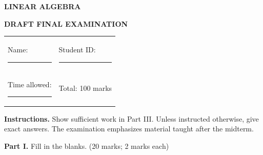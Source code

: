 \documentclass[11pt,a4paper]{article}
\newcommand{\parttitle}[2]{%
  \vspace{1mm}
  {\color{examblue}\Large\bfseries #1}\quad
  {\color{examblue}\large #2}\par\vspace{3mm}
}
\begin{document}
\begin{center}
  {\color{examblue}\LARGE\bfseries LINEAR ALGEBRA}\par
  \vspace{1mm}
  {\color{examblue}\Large\bfseries DRAFT FINAL EXAMINATION}
\end{center}

\vspace{3mm}
\begin{tabular*}{\textwidth}{@{\extracolsep{\fill}}ll}
Name: \rule{68mm}{0.4pt} & Student ID: \rule{48mm}{0.4pt}\\[3mm]
Time allowed: \rule{25mm}{0.4pt} & Total: 100 marks
\end{tabular*}

\vspace{4mm}
\textbf{Instructions.} Show sufficient work in Part III. Unless instructed otherwise,
give exact answers. The examination emphasizes material taught after the midterm.

\parttitle{Part I.}{Fill in the blanks. (20 marks; 2 marks each)}
\end{document}
